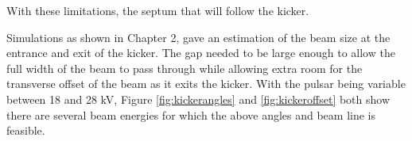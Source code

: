 With these limitations, the septum that will follow the kicker.

Simulations as shown in Chapter 2, gave an estimation of the beam size at the entrance and exit of the kicker.
The gap needed to be large enough to allow the full width of the beam to pass through while allowing extra room
for the transverse offset of the beam as it exits the kicker.  With the pulsar being variable between 18 and 28 kV,
Figure \ref{fig:kickerangles} and \ref{fig:kickeroffset}
both show there are several beam energies for which the above angles and beam line is feasible.




